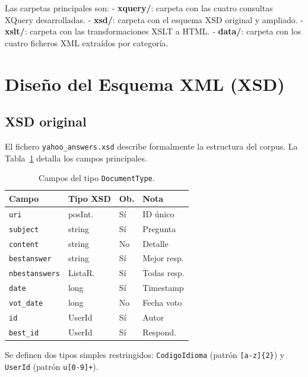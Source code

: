 \documentclass[10pt,twocolumn,a4paper]{article}
\begin{document}
Las carpetas principales son:
- \textbf{xquery/}: carpeta con las cuatro consultas XQuery desarrolladas.
- \textbf{xsd/}: carpeta con el esquema XSD original y ampliado.
- \textbf{xslt/}: carpeta con las transformaciones XSLT a HTML.
- \textbf{data/}: carpeta con los cuatro ficheros XML extra\'idos por categor\'ia.

\section{Dise\~no del Esquema XML (XSD)}

\subsection{XSD original}

El fichero \texttt{yahoo\_answers.xsd} describe formalmente la estructura
del corpus. La Tabla~\ref{tab:xsd_campos} detalla los campos principales.

\begin{table}[H]
\centering
\caption{Campos del tipo \texttt{DocumentType}.}
\label{tab:xsd_campos}
\begin{tabular}{p{1.9cm}p{1.4cm}p{0.6cm}p{1.0cm}}
\toprule
\textbf{Campo} & \textbf{Tipo XSD} & \textbf{Ob.} & \textbf{Nota} \\
\midrule
\texttt{uri}         & posInt.  & S\'i & ID \'unico \\
\texttt{subject}     & string   & S\'i & Pregunta \\
\texttt{content}     & string   & No  & Detalle \\
\texttt{bestanswer}  & string   & S\'i & Mejor resp. \\
\texttt{nbestanswers}& ListaR.  & S\'i & Todas resp. \\
\texttt{date}        & long     & S\'i & Timestamp \\
\texttt{vot\_date}   & long     & No  & Fecha voto \\
\texttt{id}          & UserId   & S\'i & Autor \\
\texttt{best\_id}    & UserId   & S\'i & Respond. \\
\bottomrule
\end{tabular}
\end{table}

Se definen dos tipos simples restringidos: \texttt{CodigoIdioma}
(patr\'on \texttt{[a-z]\{2\}}) y \texttt{UserId} (patr\'on
\texttt{u[0-9]+}).
\end{document}

